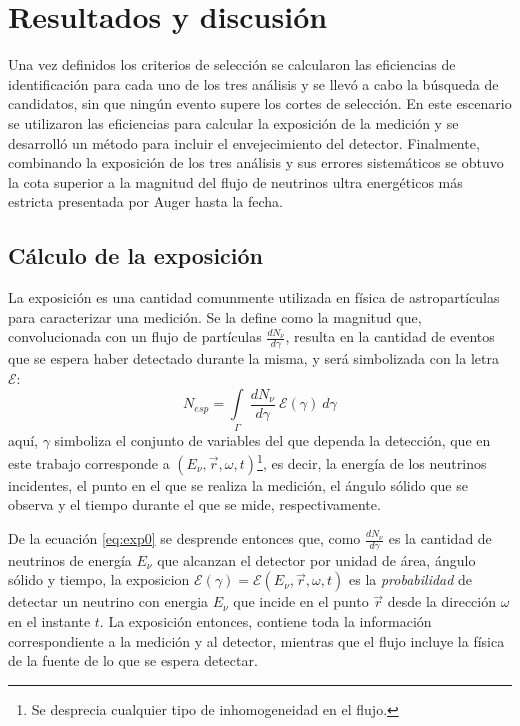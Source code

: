 \chapter{Resultados y discusi\'on}
\label{ch:resAuger}

Una vez definidos los criterios de selección se calcularon las eficiencias de identificación para cada uno de los tres análisis y se llevó a cabo la búsqueda de candidatos, sin que ningún evento supere los cortes de selección.
En este escenario se utilizaron las eficiencias para calcular la exposición de la medición y se desarroll\'o un m\'etodo para incluir el envejecimiento del detector.
Finalmente, combinando la exposici\'on de los tres an\'alisis y sus errores sistem\'aticos se obtuvo la cota superior a la magnitud del flujo de neutrinos ultra energéticos m\'as estricta presentada por Auger hasta la fecha.

\section{C\'alculo de la exposici\'on}
\label{sc:expoNu}
	
	La exposición es una cantidad comunmente utilizada en física de astropartículas para caracterizar una medición.
	Se la define como la magnitud que, convolucionada con un flujo de partículas $\frac{dN_{\nu}}{d\gamma}$, resulta en la cantidad de eventos que se espera haber detectado durante la misma, y ser\'a simbolizada con la letra $\mathscr{E}$:
	\begin{equation}
	 N_{esp}=\int\limits_{\Gamma}~\frac{dN_{\nu}}{d\gamma}~\mathscr{E}(\gamma) ~d\gamma
	 \label{eq:exp0}
	\end{equation}
	aqu\'i, $\gamma$ simboliza el conjunto de variables del que dependa la detección, que en este trabajo corresponde a $(E_{\nu},\vec{r},\omega,t)$\footnote{Se desprecia cualquier tipo de inhomogeneidad en el flujo.}, es decir, la energía de los neutrinos incidentes, el punto en el que se realiza la medici\'on, el ángulo sólido que se observa y el tiempo durante el que se mide, respectivamente.
	
	De la ecuación \ref{eq:exp0} se desprende entonces que, como $\frac{dN_{\nu}}{d\gamma}$ es la cantidad de neutrinos de energía $E_{\nu}$ que alcanzan el detector por unidad de área, ángulo sólido y tiempo, la exposicion $\mathscr{E}(\gamma)=\mathscr{E}(E_{\nu},\vec{r},\omega,t)$ es la \emph{probabilidad} de detectar un neutrino con energia $E_\nu$ que incide en el punto $\vec{r}$ desde la direcci\'on $\omega$ en el instante $t$.
	La exposición entonces, contiene toda la información correspondiente a la medición y al detector, mientras que el flujo incluye la física de la fuente de lo que se espera detectar.
	
